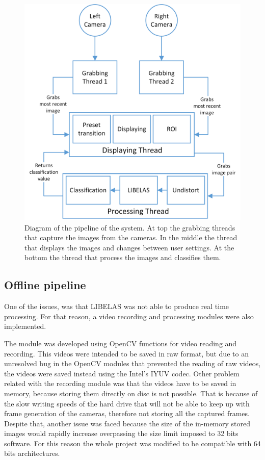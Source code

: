 \documentclass[10pt,a4paper,twocolumn,twoside]{article}
\begin{document}
	\begin{figure}
		\centering
		\includegraphics[width=1\linewidth]{img/pipeline.png}
		\caption{Diagram of the pipeline of the system. At top the grabbing threads that capture the images from the cameras. In the middle the thread that displays the images and changes between user settings. At the bottom the thread that process the images and classifies them. }
		\label{fig:pipeline}
	\end{figure}
	
	
	\subsection{Offline pipeline}
	One of the issues, was that LIBELAS was not able to produce real time processing. For that reason, a video recording and processing modules were also implemented.  
	
	The module was developed using OpenCV functions for video reading and recording. This videos were intended to be saved in raw format, but due to an unresolved bug in the OpenCV modules that prevented the reading of raw videos, the videos were saved instead using the Intel's IYUV codec. %
	Other problem related with the recording module was that the videos have to be saved in memory, because storing them directly on disc is not possible. That is because of the slow writing speeds of the hard drive that will not be able to keep up with frame generation of the cameras, therefore not storing all the captured frames. Despite that, another issue was faced because the size of the in-memory stored images would rapidly increase overpassing the size limit imposed to 32 bits software. For this reason the whole project was modified to be compatible with 64 bits architectures.
	
\end{document}
